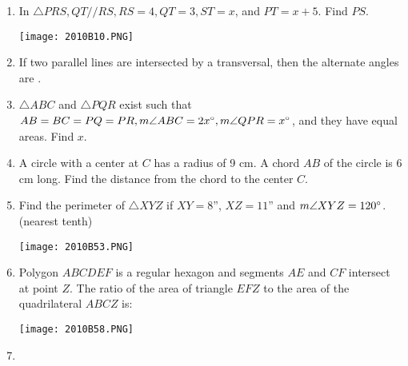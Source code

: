 \documentclass[../uilmath.tex]{subfiles}
\begin{document}
\begin{enumerate}[label=\bfseries\arabic*.]
    \item %
    In $\triangle PRS, QT // RS, RS=4, QT=3, ST=x$, and $PT=x+5$. Find $PS$.
    \begin{center}
        \texttt{[image: 2010B10.PNG]}
    \end{center}

    \item %
    If two parallel lines are intersected by a transversal, then the alternate angles are \blank .

    \item %
    $\triangle ABC$ and $\triangle PQR$ exist such that $AB=BC=PQ=PR, m\angle ABC = 2x\degree, m\angle QPR = x\degree$, and they have equal areas. Find $x$.

    \item %
    A circle with a center at $C$ has a radius of 9 cm. A chord $AB$ of the circle is 6 cm long. Find the distance from the chord to the center $C$.

    \item %
    Find the perimeter of $\triangle XYZ$ if $XY=8$'', $XZ=11$'' and $m\angle XYZ=120\degree$. (nearest tenth)
    \begin{center}
        \texttt{[image: 2010B53.PNG]}
    \end{center}

    \item %
    Polygon $ABCDEF$ is a regular hexagon and segments $AE$ and $CF$ intersect at point $Z$. The ratio of the area of triangle $EFZ$ to the area of the quadrilateral $ABCZ$ is:
    \begin{center}
        \texttt{[image: 2010B58.PNG]}
    \end{center}

    \item %
    
\end{enumerate}
\end{document}
